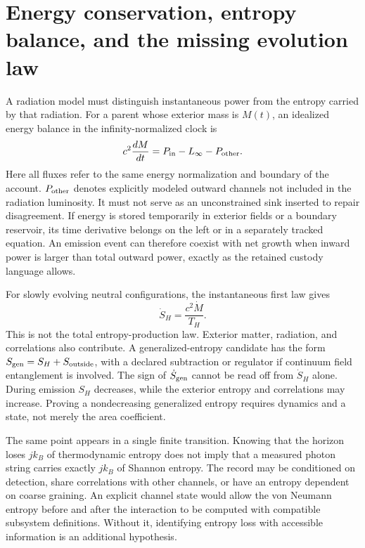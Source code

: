\section{Energy conservation, entropy balance, and the missing evolution law}
A radiation model must distinguish instantaneous power from the entropy carried by that radiation. For a parent whose exterior mass is $M(t)$, an idealized energy balance in the infinity-normalized clock is
\begin{equation}
 c^2\frac{dM}{dt}=P_{\rm in}-L_\infty-P_{\rm other}.
 \label{c7:massbalance}
\end{equation}
Here all fluxes refer to the same energy normalization and boundary of the account. $P_{\rm other}$ denotes explicitly modeled outward channels not included in the radiation luminosity. It must not serve as an unconstrained sink inserted to repair disagreement. If energy is stored temporarily in exterior fields or a boundary reservoir, its time derivative belongs on the left or in a separately tracked equation. An emission event can therefore coexist with net growth when inward power is larger than total outward power, exactly as the retained custody language allows.

For slowly evolving neutral configurations, the instantaneous first law gives
\begin{equation}
 \dot S_H=\frac{c^2\dot M}{T_H}.
 \label{c7:entropyrate}
\end{equation}
This is not the total entropy-production law. Exterior matter, radiation, and correlations also contribute. A generalized-entropy candidate has the form $S_{\rm gen}=S_H+S_{\rm outside}$, with a declared subtraction or regulator if continuum field entanglement is involved. The sign of $\dot S_{\rm gen}$ cannot be read off from $\dot S_H$ alone. During emission $S_H$ decreases, while the exterior entropy and correlations may increase. Proving a nondecreasing generalized entropy requires dynamics and a state, not merely the area coefficient.

The same point appears in a single finite transition. Knowing that the horizon loses $jk_B$ of thermodynamic entropy does not imply that a measured photon string carries exactly $jk_B$ of Shannon entropy. The record may be conditioned on detection, share correlations with other channels, or have an entropy dependent on coarse graining. An explicit channel state would allow the von Neumann entropy before and after the interaction to be computed with compatible subsystem definitions. Without it, identifying entropy loss with accessible information is an additional hypothesis.

